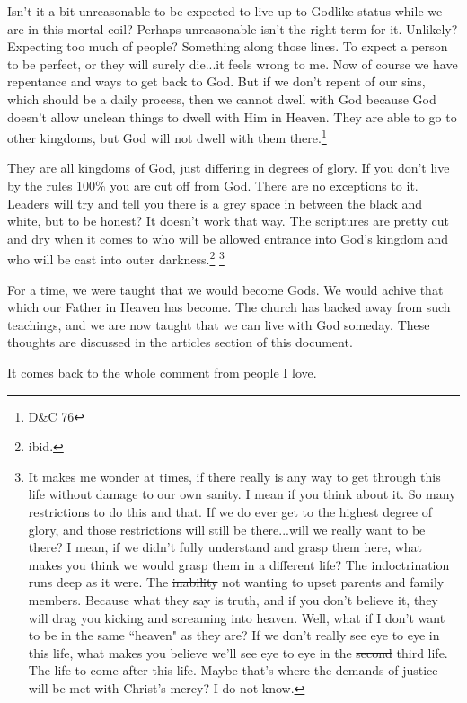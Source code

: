 Isn't it a bit unreasonable to be expected to live up to Godlike status while we
are in this mortal coil? Perhaps unreasonable isn't the right term for it.
Unlikely? Expecting too much of people? Something along those lines. To expect a
person to be perfect, or they will surely die...it feels wrong to me. Now of
course we have repentance and ways to get back to God. But if we don't repent of
our sins, which should be a daily process, then we cannot dwell with God because
God doesn't allow unclean things to dwell with Him in Heaven. They are able to
go to other kingdoms, but God will not dwell with them there.\footnote{D\&C 76}

They are all kingdoms of God, just differing in degrees of glory. If you don't
live by the rules 100\% you are cut off from God. There are no exceptions to it.
Leaders will try and tell you there is a grey space in between the black and
white, but to be honest? It doesn't work that way. The scriptures are pretty cut
and dry when it comes to who will be allowed entrance into God's kingdom and who
will be cast into outer darkness.\footnote{ibid.}
\footnote{It makes me wonder at times, if there really is any way to get through 
this life without damage to our own sanity. I mean if you think about it. So 
many restrictions to do this and that. If we do ever get to the highest degree 
of glory, and those restrictions will still be there...will we really want to 
be there? I mean, if we didn't fully understand and grasp them here, what makes 
you think we would grasp them in a different life? The indoctrination runs
deep as it were. The \st{inability} not wanting to upset parents and family
members. Because what they say is truth, and if you don't believe it, they will
drag you kicking and screaming into heaven. Well, what if I don't want to be in
the same ``heaven" as they are? If we don't really see eye to eye in this life,
what makes you believe we'll see eye to eye in the \st{second} third life. The
life to come after this life. Maybe that's where the demands of justice will be
met with Christ's mercy? I do not know.}

For a time, we were taught that we would become Gods. We would achive that which
our Father in Heaven has become. The church has backed away from such teachings, 
and we are now taught that we can live with God someday. These thoughts are 
discussed in the articles section of this document.

It comes back to the whole comment from people I love.

